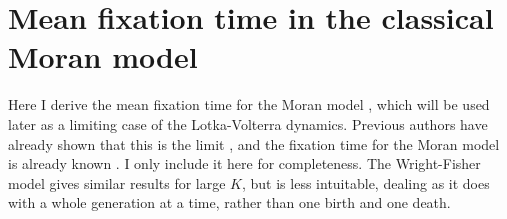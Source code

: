 \section{Mean fixation time in the classical Moran model}
Here I derive the mean fixation time for the Moran model \cite{Moran1962}, which will be used later as a limiting case of the Lotka-Volterra dynamics. 
Previous authors have already shown that this is the limit \cite{blah}, and the fixation time for the Moran model is already known \cite{Moran1962}. I only include it here for completeness. 
The Wright-Fisher model gives similar results for large $K$, but is less intuitable, dealing as it does with a whole generation at a time, rather than one birth and one death. %

